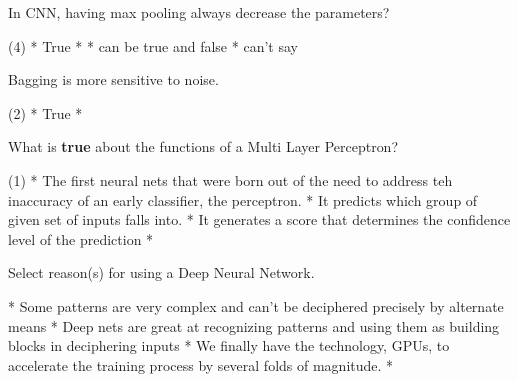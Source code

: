\documentclass[11pt]{extarticle}
\begin{document}
\begin{exercise}
    In CNN, having max pooling always decrease the parameters?
    \begin{choice} (4)
        * True
        * 
        * can be true and false
        * can't say
    \end{choice}
\end{exercise}
\begin{solution}
\end{solution}

\begin{exercise}
    Bagging is more sensitive to noise.
    \begin{choice} (2)
        * True
        * 
    \end{choice}
\end{exercise}
\begin{solution}
\end{solution}

\begin{exercise}
    What is \textbf{true} about the functions of a Multi Layer Perceptron?
    \begin{choice} (1)
        * The first neural nets that were born out of the need to address teh inaccuracy of an early classifier, the perceptron.
        * It predicts which group of given set of inputs falls into.
        * It generates a score that determines the confidence level of the prediction
        * 
    \end{choice}
\end{exercise}
\begin{solution}
\end{solution}

\begin{exercise}
    Select reason(s) for using a Deep Neural Network.
    \begin{choice}
        * Some patterns are very complex and can't be deciphered precisely by alternate means
        * Deep nets are great at recognizing patterns and using them as building blocks in deciphering inputs
        * We finally have the technology, GPUs, to accelerate the training process by several folds of magnitude.
        * 
    \end{choice}
\end{exercise}
\begin{solution}
\end{solution}
\end{document}
